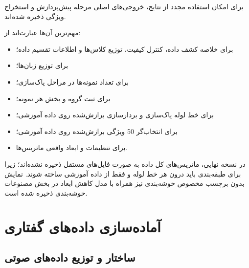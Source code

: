 \documentclass[12pt,a4paper,oneside]{report}
\begin{document}
برای امکان استفاده مجدد از نتایج، خروجی‌های اصلی مرحله پیش‌پردازش و استخراج ویژگی ذخیره شده‌اند.

مهم‌ترین آن‌ها عبارت‌اند از:

\begin{itemize}

	\item {} برای خلاصه کشف داده، کنترل کیفیت، توزیع کلاس‌ها و اطلاعات تقسیم داده؛

	\item {} برای توزیع زبان‌ها؛

	\item {} برای تعداد نمونه‌ها در مراحل پاک‌سازی؛

	\item {} برای ثبت گروه و بخش هر نمونه؛

	\item {} برای خط لوله پاک‌سازی و بردارسازی برازش‌شده روی داده آموزشی؛

	\item {} برای انتخاب‌گر 50 ویژگی برازش‌شده روی داده آموزشی؛

	\item {} برای تنظیمات و ابعاد واقعی ماتریس‌ها.

\end{itemize}

در نسخه نهایی، ماتریس‌های
کل داده به صورت فایل‌های مستقل
ذخیره نشده‌اند؛ زیرا برای طبقه‌بندی باید درون هر خط لوله و فقط از داده آموزشی ساخته شوند. نمایش بدون برچسب مخصوص خوشه‌بندی نیز همراه با مدل کاهش ابعاد در بخش مصنوعات خوشه‌بندی ذخیره شده است.


\section{آماده‌سازی داده‌های گفتاری}


\subsection{ساختار و توزیع داده‌های صوتی}
\end{document}
